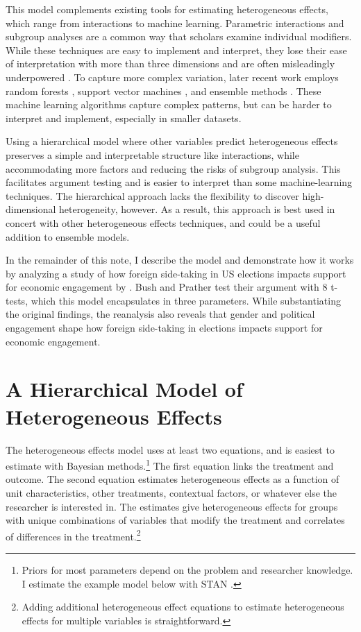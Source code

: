 \documentclass[12pt]{article}
\begin{document}
This model complements existing tools for estimating heterogeneous effects, which range from interactions to machine learning. 
Parametric interactions and subgroup analyses are a common way that scholars examine individual modifiers. 
While these techniques are easy to implement and interpret, they lose their ease of interpretation with more than three dimensions and are often misleadingly underpowered \citep{Simmonsetal2011}. 
To capture more complex variation, later recent work employs random forests \citep{GreenKern2012, WagerAthey2018}, support vector machines \citep{ImaiRatkovic2013}, and ensemble methods \citep{Grimmeretal2017, Kuenzeletal2019, Dorieetal2022}.
These machine learning algorithms capture complex patterns, but can be harder to interpret and implement, especially in smaller datasets. 

 
Using a hierarchical model where other variables predict heterogeneous effects preserves a simple and interpretable structure like interactions, while accommodating more factors and reducing the risks of subgroup analysis. 
This facilitates argument testing and is easier to interpret than some machine-learning techniques.
The hierarchical approach lacks the flexibility to discover high-dimensional heterogeneity, however.  
As a result, this approach is best used in concert with other heterogeneous effects techniques, and could be a useful addition to ensemble models. 


In the remainder of this note, I describe the model and demonstrate how it works by analyzing a study of how foreign side-taking in US elections impacts support for economic engagement by \citet{BushPrather2020}.
Bush and Prather test their argument with 8 t-tests, which this model encapsulates in three parameters.  
While substantiating the original findings, the reanalysis also reveals that gender and political engagement shape how foreign side-taking in elections impacts support for economic engagement.



\section{A Hierarchical Model of Heterogeneous Effects}


The heterogeneous effects model uses at least two equations, and is easiest to estimate with Bayesian methods.\footnote{Priors for most parameters depend on the problem and researcher knowledge. I estimate the example model below with STAN \citep{Carpenteretal2016}.} 
The first equation links the treatment and outcome. 
The second equation estimates heterogeneous effects as a function of unit characteristics, other treatments, contextual factors, or whatever else the researcher is interested in. 
The estimates give heterogeneous effects for groups with unique combinations of variables that modify the treatment and correlates of differences in the treatment.\footnote{Adding additional heterogeneous effect equations to estimate heterogeneous effects for multiple variables is straightforward.}  
\end{document}
